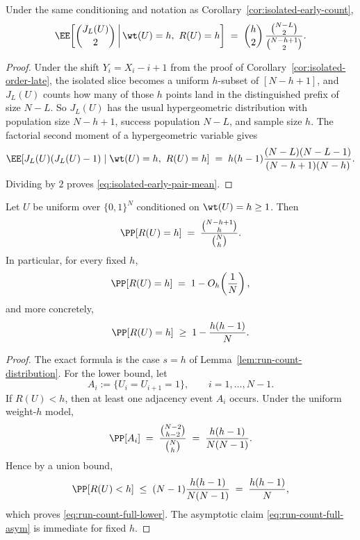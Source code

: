 \begin{corollary}
\label{cor:isolated-early-pair-mean}
Under the same conditioning and notation as Corollary~\ref{cor:isolated-early-count},
\begin{equation}
\label{eq:isolated-early-pair-mean}
\EE\!\left[\binom{J_L(U)}{2}\,\middle|\, \wt(U)=h,\ R(U)=h\right]
\;=\;
\binom{h}{2}\,
\frac{\binom{N-L}{2}}{\binom{N-h+1}{2}}.
\end{equation}
\end{corollary}

\begin{proof}
Under the shift \(Y_i=X_i-i+1\) from the proof of Corollary~\ref{cor:isolated-order-late}, the isolated slice becomes a
uniform \(h\)-subset of \([N-h+1]\), and \(J_L(U)\) counts how many of those \(h\) points land in the distinguished
prefix of size \(N-L\). So \(J_L(U)\) has the usual hypergeometric distribution with population size \(N-h+1\),
success population \(N-L\), and sample size \(h\). The factorial second moment of a hypergeometric variable gives
\[
\EE[J_L(U)(J_L(U)-1)\mid \wt(U)=h,\ R(U)=h]
\;=\;
h(h-1)\frac{(N-L)(N-L-1)}{(N-h+1)(N-h)}.
\]
Dividing by \(2\) proves \eqref{eq:isolated-early-pair-mean}.
\end{proof}

\begin{corollary}
\label{cor:run-count-full}
Let $U$ be uniform over $\{0,1\}^N$ conditioned on $\wt(U)=h\ge 1$.
Then
\begin{equation}
\label{eq:run-count-full}
\PP[R(U)=h]
\;=\;
\frac{\binom{N-h+1}{h}}{\binom{N}{h}}.
\end{equation}
In particular, for every fixed $h$,
\begin{equation}
\label{eq:run-count-full-asym}
\PP[R(U)=h]
\;=\;
1-O_h\!\left(\frac{1}{N}\right),
\end{equation}
and more concretely,
\begin{equation}
\label{eq:run-count-full-lower}
\PP[R(U)=h]
\;\ge\;
1-\frac{h(h-1)}{N}.
\end{equation}
\end{corollary}

\begin{proof}
The exact formula is the case $s=h$ of Lemma~\ref{lem:run-count-distribution}. For the lower bound, let
\[
A_i:=\{U_i=U_{i+1}=1\},\qquad i=1,\dots,N-1.
\]
If $R(U)<h$, then at least one adjacency event $A_i$ occurs. Under the uniform weight-$h$ model,
\[
\PP[A_i]
\;=\;
\frac{\binom{N-2}{h-2}}{\binom{N}{h}}
\;=\;
\frac{h(h-1)}{N(N-1)}.
\]
Hence by a union bound,
\[
\PP[R(U)<h]
\;\le\;
(N-1)\frac{h(h-1)}{N(N-1)}
\;=\;
\frac{h(h-1)}{N},
\]
which proves \eqref{eq:run-count-full-lower}. The asymptotic claim \eqref{eq:run-count-full-asym} is immediate for
fixed \(h\).
\end{proof}

